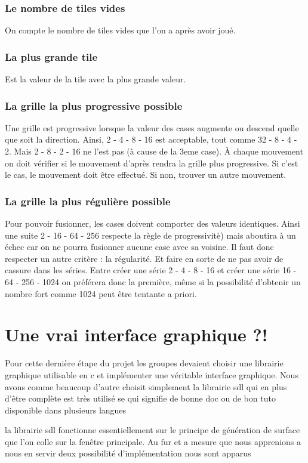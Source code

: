 \documentclass[12pt]{article}
\begin{document}
\subsubsection{Le nombre de tiles vides}
On compte le nombre de tiles vides que l'on a après avoir joué.
\subsubsection{La plus grande tile} 
Est la valeur de la tile avec la plus grande valeur.

\subsubsection{La grille la plus progressive possible}
Une grille est progressive lorsque la valeur des cases augmente ou descend
quelle que soit la direction. Ainsi, 2 - 4 - 8 - 16 est acceptable, tout comme
32 - 8 - 4 - 2. Mais 2 - 8 - 2 - 16 ne l'est pas (\`a cause de la 3eme case).
\`A chaque mouvement on doit vérifier si  le mouvement d'apr\`es rendra la
grille plus progressive. Si c'est le cas, le mouvement doit \^etre effectu\'e.
Si non, trouver un autre mouvement.

\subsubsection{La grille la plus réguli\`ere possible}
Pour pouvoir fusionner, les cases doivent comporter des valeurs identiques.
Ainsi une suite 2 - 16 - 64 - 256 respecte la r\`egle de progressivit\`e) mais
aboutira à un \'echec car on ne pourra fusionner aucune case avec sa voisine. Il
faut donc respecter un autre crit\`ere : la r\'egularit\'e. Et faire en sorte de
ne pas avoir de cassure dans les s\'eries. Entre cr\'eer une série 2 - 4 - 8 -
16 et cr\'eer une s\'erie 16 - 64 - 256 - 1024 on pr\'ef\'erera donc la
premi\`ere, m\^eme si la possibilit\'e d'obtenir un nombre fort comme 1024 peut
\^etre tentante a priori.

\newpage
\section{Une vrai interface graphique ?!}
Pour cette dernière étape du projet les groupes devaient choisir une librairie graphique
utilisable en c et implémenter une véritable interface graphique. Nous avons comme
beaucoup d'autre choisit simplement la librairie sdl qui en plus d’être
complète est très utilisé se qui signifie de bonne doc ou de bon tuto disponible
dans plusieurs langues
\par la librairie sdl fonctionne essentiellement sur le principe de génération de
surface que l'on colle sur la fenêtre principale. Au fur et a mesure que nous apprenions a nous en servir
deux possibilité d’implémentation nous sont apparus
\end{document}
